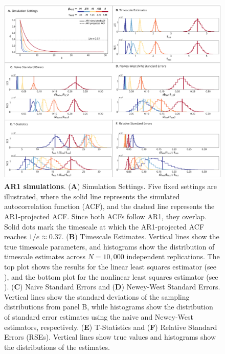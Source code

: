 \documentclass[latex/main.tex]{subfiles}
\begin{document}
\begin{figure}[H]
    \centering
    \includegraphics[width=1\textwidth]{latex/results/fig01-ar1.png} 
    \caption{
    \textbf{AR1 simulations}.
    (\textbf{A}) Simulation Settings. Five fixed settings are illustrated, where the solid line represents the simulated autocorrelation function (ACF), and the dashed line represents the AR1-projected ACF. Since both ACFs follow AR1, they overlap. Solid dots mark the timescale at which the AR1-projected ACF reaches $1/e \approx 0.37$.
    (\textbf{B}) Timescale Estimates. Vertical lines show the true timescale parameters, and histograms show the distribution of timescale estimates across $N=10,000$ independent replications. The top plot shows the results for the linear least squares estimator (see ), and the bottom plot for the nonlinear least squares estimator (see ).
    (\textbf{C}) Naive Standard Errors and (\textbf{D}) Newey-West Standard Errors. Vertical lines show the standard deviations of the sampling distributions from panel B, while histograms show the distribution of standard error estimates using the naive and Newey-West estimators, respectively.
    (\textbf{E}) T-Statistics and (\textbf{F}) Relative Standard Errors (RSEs). Vertical lines show true values and histograms show the distributions of the estimates. 
    }
    \label{fig:sim-ar1}
\end{figure}
\end{document}
